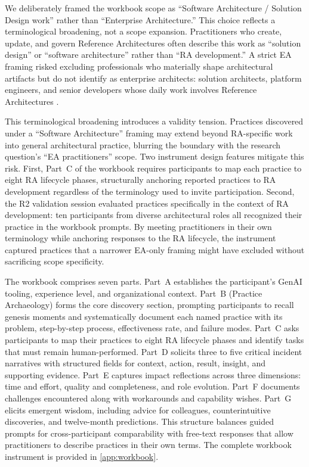 We deliberately framed the workbook scope as ``Software Architecture / Solution
Design work'' rather than ``Enterprise Architecture.'' This choice reflects a
terminological broadening, not a scope expansion. Practitioners who create,
update, and govern Reference Architectures often describe this work as
``solution design'' or ``software architecture'' rather than ``RA development.''
A strict EA framing risked excluding professionals who materially shape
architectural artifacts but do not identify as enterprise architects: solution
architects, platform engineers, and senior developers whose daily work involves
Reference Architectures
\parencite[see Section~\ref{sec:theoretical-background}]{kotusev_enterprise_2018}.

This terminological broadening introduces a validity tension. Practices
discovered under a ``Software Architecture'' framing may extend beyond
RA-specific work into general architectural practice, blurring the boundary
with the research question's ``EA practitioners'' scope. Two instrument design
features mitigate this risk. First, Part~C of the workbook requires
participants to map each practice to eight RA lifecycle phases, structurally
anchoring reported practices to RA development regardless of the terminology
used to invite participation. Second, the R2 validation session evaluated
practices specifically in the context of RA development: ten participants from
diverse architectural roles all recognized their practice in the workbook
prompts. By meeting practitioners in their own terminology while anchoring
responses to the RA lifecycle, the instrument captured practices that a narrower
EA-only framing might have excluded without sacrificing scope specificity.

The workbook comprises seven parts. Part~A establishes the
participant's GenAI tooling, experience level, and organizational context.
Part~B (Practice Archaeology) forms the core discovery section, prompting
participants to recall genesis moments and systematically document each named
practice with its problem, step-by-step process, effectiveness rate, and
failure modes. Part~C asks participants to map their practices to eight RA
lifecycle phases and identify tasks that must remain human-performed. Part~D
solicits three to five critical incident narratives with structured fields for
context, action, result, insight, and supporting evidence. Part~E captures
impact reflections across three dimensions: time and effort, quality and
completeness, and role evolution. Part~F documents challenges encountered along
with workarounds and capability wishes. Part~G elicits emergent wisdom,
including advice for colleagues, counterintuitive discoveries, and twelve-month
predictions. This structure balances guided prompts for cross-participant
comparability with free-text responses that allow practitioners to describe
practices in their own terms. The complete workbook instrument is provided in
\ref{app:workbook}.

